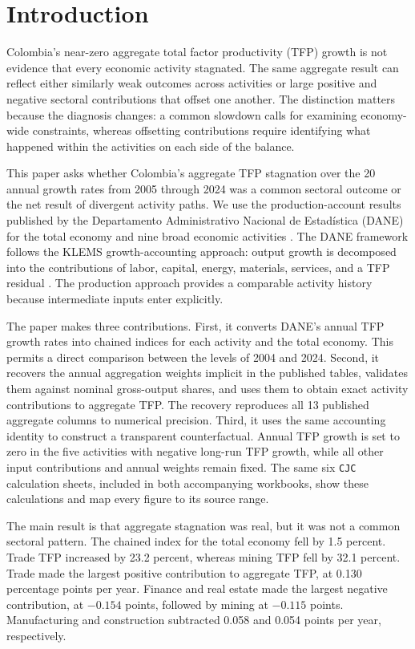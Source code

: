 \section{Introduction}

Colombia's near-zero aggregate total factor productivity (TFP) growth is not evidence that every economic activity stagnated. The same aggregate result can reflect either similarly weak outcomes across activities or large positive and negative sectoral contributions that offset one another. The distinction matters because the diagnosis changes: a common slowdown calls for examining economy-wide constraints, whereas offsetting contributions require identifying what happened within the activities on each side of the balance.

This paper asks whether Colombia's aggregate TFP stagnation over the 20 annual growth rates from 2005 through 2024 was a common sectoral outcome or the net result of divergent activity paths. We use the production-account results published by the Departamento Administrativo Nacional de Estad\'istica (DANE) for the total economy and nine broad economic activities \citep{DANE2025Annex}. The DANE framework follows the KLEMS growth-accounting approach: output growth is decomposed into the contributions of labor, capital, energy, materials, services, and a TFP residual \citep{DANE2022TFP,OECD2001Productivity,LAKLEMS2021}. The production approach provides a comparable activity history because intermediate inputs enter explicitly.

The paper makes three contributions. First, it converts DANE's annual TFP growth rates into chained indices for each activity and the total economy. This permits a direct comparison between the levels of 2004 and 2024. Second, it recovers the annual aggregation weights implicit in the published tables, validates them against nominal gross-output shares, and uses them to obtain exact activity contributions to aggregate TFP. The recovery reproduces all 13 published aggregate columns to numerical precision. Third, it uses the same accounting identity to construct a transparent counterfactual. Annual TFP growth is set to zero in the five activities with negative long-run TFP growth, while all other input contributions and annual weights remain fixed. The same six \texttt{CJC} calculation sheets, included in both accompanying workbooks, show these calculations and map every figure to its source range.

The main result is that aggregate stagnation was real, but it was not a common sectoral pattern. The chained index for the total economy fell by 1.5 percent. Trade TFP increased by 23.2 percent, whereas mining TFP fell by 32.1 percent. Trade made the largest positive contribution to aggregate TFP, at 0.130 percentage points per year. Finance and real estate made the largest negative contribution, at $-0.154$ points, followed by mining at $-0.115$ points. Manufacturing and construction subtracted 0.058 and 0.054 points per year, respectively.

